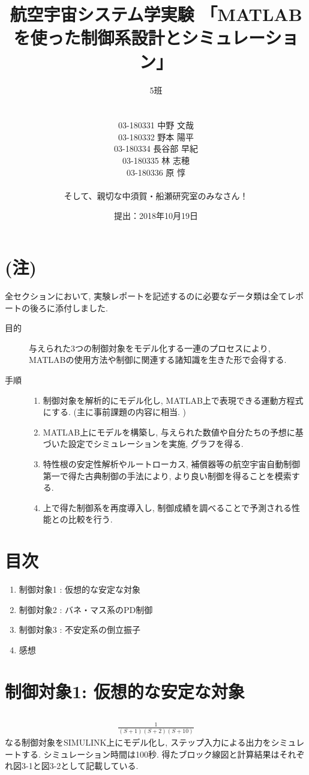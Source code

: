 \documentclass[12pt]{jsarticle}   	%
\title{\Huge{航空宇宙システム学実験 「MATLABを使った制御系設計とシミュレーション」}}
\author{\LARGE{5班} \\ \\ \\ \large{03-180331 中野 文哉} \\ \large{03-180332 野本 陽平} \\ \large{03-180334 長谷部 早紀} \\  \large{03-180335 林 志穂} \\ {03-180336 原 惇} \\ \\ \large{そして、親切な中須賀・船瀬研究室のみなさん！}}
\date{\large{提出：2018年10月19日}}
\begin{document}
\maketitle
\newpage

\section*{(注)}
\noindent
全セクションにおいて, 実験レポートを記述するのに必要なデータ類は全てレポートの後ろに添付しました.
\newline
\begin{description}
	\item [目的] 与えられた3つの制御対象をモデル化する一連のプロセスにより, MATLABの使用方法や制御に関連する諸知識を生きた形で会得する. 
	\newline
	\item [手順] \begin{enumerate}
	\item 制御対象を解析的にモデル化し, MATLAB上で表現できる運動方程式にする. (主に事前課題の内容に相当. )
	\item MATLAB上にモデルを構築し, 与えられた数値や自分たちの予想に基づいた設定でシミュレーションを実施, グラフを得る. 
	\item 特性根の安定性解析やルートローカス, 補償器等の航空宇宙自動制御第一で得た古典制御の手法により, より良い制御を得ることを模索する. 
	\item 上で得た制御系を再度導入し, 制御成績を調べることで予測される性能との比較を行う. 
\end{enumerate}
\end{description}

\section*{目次}
\begin{enumerate}
	\item 制御対象1 : 仮想的な安定な対象
	\item 制御対象2 : バネ・マス系のPD制御
	\item 制御対象3 : 不安定系の倒立振子
	\item 感想
\end{enumerate}

\section{制御対象1: 仮想的な安定な対象}
\subsection{}
\begin{eqnarray}
\frac{1}{(S+1)(S+2)(S+10)}
\end{eqnarray}
\newline
なる制御対象をSIMULINK上にモデル化し, ステップ入力による出力をシミュレートする. シミュレーション時間は100秒. 得たブロック線図と計算結果はそれぞれ図3-1と図3-2として記載している. 
\end{document}
